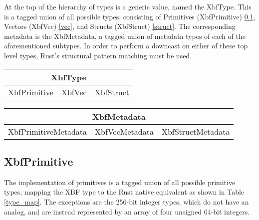 \documentclass[conference]{IEEEtran}
\begin{document}
At the top of the hierarchy of types is a generic value, named the XbfType. This is a tagged union of all possible types, consisting of Primitives (XbfPrimitive) \ref{primitives}, Vectors (XbfVec)
\ref{vec}, and Structs (XbfStruct) \ref{struct}. The corresponding metadata is the XbfMetadata, a tagged union of metadata types of each of the aforementioned subtypes. In order to perform a downcast on either of these top level types, Rust's structural pattern matching must be used.

\begin{table}[htbp]
	\begin{center}
		\begin{tabular}{|c|c|c|}
			\hline
			\multicolumn{3}{|c|}{XbfType}     \\
			\hline
			XbfPrimitive & XbfVec & XbfStruct \\
			\hline
		\end{tabular}
	\end{center}
\end{table}

\begin{table}[htbp]
	\begin{center}
		\begin{tabular}{|c|c|c|}
			\hline
			\multicolumn{3}{|c|}{XbfMetadata}                         \\
			\hline
			XbfPrimitiveMetadata & XbfVecMetadata & XbfStructMetadata \\
			\hline
		\end{tabular}
	\end{center}
\end{table}

\subsection{XbfPrimitive}\label{primitives}

The implementation of primitives is a tagged union of all possible primitive types, mapping the XBF type to the Rust native equivalent as shown in Table \ref{type_map}. The exceptions are the 256-bit integer types, which do not have an analog, and are instead represented by an array of four unsigned 64-bit integers.
\end{document}
